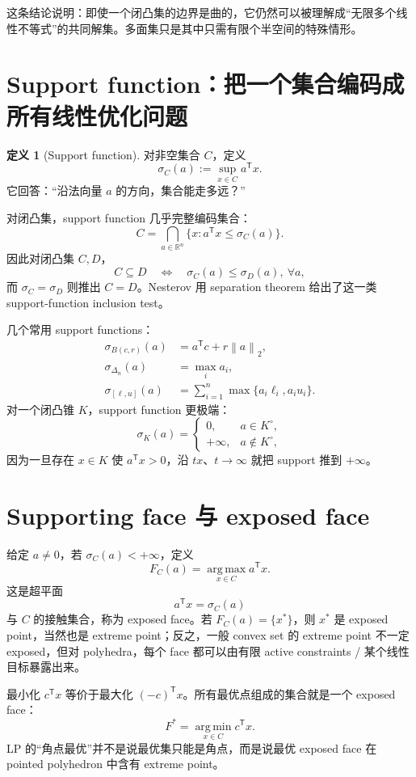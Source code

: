 \documentclass[11pt,a4paper,openany]{ctexrep}
\theoremstyle{definition}
\newtheorem{definition}[theorem]{定义}
\newcommand{\R}{\mathbb{R}}
\newcommand{\argmin}{\operatorname*{arg\,min}}
\newcommand{\argmax}{\operatorname*{arg\,max}}
\newcommand{\norm}[1]{\left\lVert #1\right\rVert}
\newcommand{\transpose}{\mathsf{T}}
\begin{document}
这条结论说明：即使一个闭凸集的边界是曲的，它仍然可以被理解成“无限多个线性不等式”的共同解集。多面集只是其中只需有限个半空间的特殊情形。\cite[\S2.5]{boyd}


\section{Support function：把一个集合编码成所有线性优化问题}
\begin{definition}[Support function]
对非空集合 $C$，定义
\[
\sigma_C(a):=\sup_{x\in C} a^\transpose x.
\]
它回答：“沿法向量 $a$ 的方向，集合能走多远？”
\end{definition}

对闭凸集，support function 几乎完整编码集合：
\[
C=\bigcap_{a\in\R^n}\{x:a^\transpose x\le\sigma_C(a)\}.
\]
因此对闭凸集 $C,D$，
\[
C\subseteq D\quad\Longleftrightarrow\quad
\sigma_C(a)\le\sigma_D(a),\ \forall a,
\]
而 $\sigma_C=\sigma_D$ 则推出 $C=D$。Nesterov 用 separation theorem 给出了这一类 support-function inclusion test。\cite[\S3.1.4]{nesterov}


几个常用 support functions：
\begin{align*}
\sigma_{B(c,r)}(a)&=a^\transpose c+r\norm a_2,\\
\sigma_{\Delta_n}(a)&=\max_i a_i,\\
\sigma_{[\ell,u]}(a)&=\sum_{i=1}^n \max\{a_i\ell_i,a_i u_i\}.
\end{align*}
对一个闭凸锥 $K$，support function 更极端：
\[
\sigma_K(a)=
\begin{cases}
0,& a\in K^\circ,\\
+\infty,& a\notin K^\circ,
\end{cases}
\]
因为一旦存在 $x\in K$ 使 $a^\transpose x>0$，沿 $tx$、$t\to\infty$ 就把 support 推到 $+\infty$。

\section{Supporting face 与 exposed face}
给定 $a\ne0$，若 $\sigma_C(a)<+\infty$，定义
\[
F_C(a)=\argmax_{x\in C}a^\transpose x.
\]
这是超平面
\[
a^\transpose x=\sigma_C(a)
\]
与 $C$ 的接触集合，称为 exposed face。若 $F_C(a)=\{x^*\}$，则 $x^*$ 是 exposed point，当然也是 extreme point；反之，一般 convex set 的 extreme point 不一定 exposed，但对 polyhedra，每个 face 都可以由有限 active constraints / 某个线性目标暴露出来。

\begin{keybox}
最小化 $c^\transpose x$ 等价于最大化 $(-c)^\transpose x$。所有最优点组成的集合就是一个 exposed face：
\[
F^*=\argmin_{x\in C}c^\transpose x.
\]
LP 的“角点最优”并不是说最优集只能是角点，而是说最优 exposed face 在 pointed polyhedron 中含有 extreme point。
\end{keybox}
\end{document}

